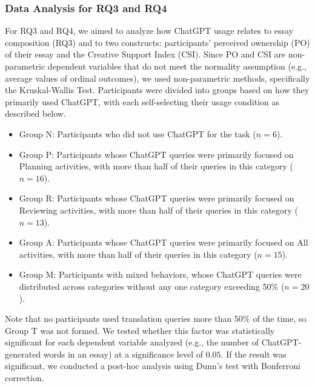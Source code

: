 \documentclass[manuscript,screen,acmsmall]{acmart}
\begin{document}
\subsubsection{Data Analysis for RQ3 and RQ4}
\label{sec:analysis34}

For RQ3 and RQ4, we aimed to analyze how ChatGPT usage relates to essay composition (RQ3) and to two constructs: participants' perceived ownership (PO) of their essay and the Creative Support Index (CSI). Since PO and CSI are non-parametric dependent variables that do not meet the normality assumption (e.g., average values of ordinal outcomes), we used non-parametric methods, specifically the Kruskal-Wallis Test. Participants were divided into groups based on how they primarily used ChatGPT, with each self-selecting their usage condition as described below.

\begin{itemize}
\justifying
    \item Group N: Participants who did not use ChatGPT for the task ($n=6$).
    \item Group P: Participants whose ChatGPT queries were primarily focused on Planning activities, with more than half of their queries in this category ($n=16$).
    \item Group R: Participants whose ChatGPT queries were primarily focused on Reviewing activities, with more than half of their queries in this category ($n=13$).
    \item Group A: Participants whose ChatGPT queries were primarily focused on All activities, with more than half of their queries in this category ($n=15$).
    \item Group M: Participants with mixed behaviors, whose ChatGPT queries were distributed across categories without any one category exceeding 50\% ($n=20$).
\end{itemize}

\noindent Note that no participants used translation queries more than 50\% of the time, so Group T was not formed. We tested whether this factor was statistically significant for each dependent variable analyzed (e.g., the number of ChatGPT-generated words in an essay) at a significance level of $0.05$. If the result was significant, we conducted a post-hoc analysis using Dunn’s test with Bonferroni correction.


\end{document}
